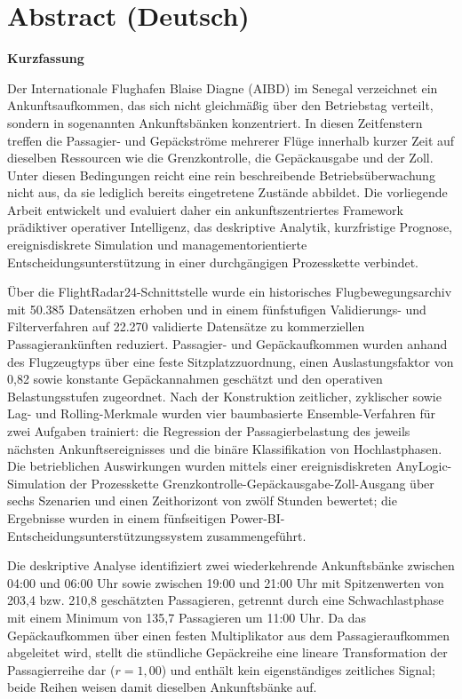 \chapter*{Abstract (Deutsch)}

\begin{center}
    \textbf{Kurzfassung}
\end{center}

Der Internationale Flughafen Blaise Diagne (AIBD) im Senegal verzeichnet ein
Ankunftsaufkommen, das sich nicht gleichmäßig über den Betriebstag verteilt,
sondern in sogenannten Ankunftsbänken konzentriert. In diesen Zeitfenstern
treffen die Passagier- und Gepäckströme mehrerer Flüge innerhalb kurzer Zeit
auf dieselben Ressourcen wie die Grenzkontrolle, die Gepäckausgabe und der Zoll.
Unter diesen Bedingungen reicht eine rein beschreibende Betriebsüberwachung
nicht aus, da sie lediglich bereits eingetretene Zustände abbildet. Die
vorliegende Arbeit entwickelt und evaluiert daher ein ankunftszentriertes
Framework prädiktiver operativer Intelligenz, das deskriptive Analytik,
kurzfristige Prognose, ereignisdiskrete Simulation und managementorientierte
Entscheidungsunterstützung in einer durchgängigen Prozesskette verbindet.

Über die FlightRadar24-Schnittstelle wurde ein historisches
Flugbewegungsarchiv mit 50.385 Datensätzen erhoben und in einem fünfstufigen
Validierungs- und Filterverfahren auf 22.270 validierte Datensätze zu
kommerziellen Passagierankünften reduziert. Passagier- und Gepäckaufkommen
wurden anhand des Flugzeugtyps über eine feste Sitzplatzzuordnung, einen
Auslastungsfaktor von 0,82 sowie konstante Gepäckannahmen geschätzt und den
operativen Belastungsstufen zugeordnet. Nach der Konstruktion zeitlicher,
zyklischer sowie Lag- und Rolling-Merkmale wurden vier baumbasierte
Ensemble-Verfahren für zwei Aufgaben trainiert: die Regression der
Passagierbelastung des jeweils nächsten Ankunftsereignisses und die binäre
Klassifikation von Hochlastphasen. Die betrieblichen Auswirkungen wurden
mittels einer ereignisdiskreten AnyLogic-Simulation der Prozesskette
Grenzkontrolle-Gepäckausgabe-Zoll-Ausgang über sechs Szenarien und einen
Zeithorizont von zwölf Stunden bewertet; die Ergebnisse wurden in einem
fünfseitigen Power-BI-Entscheidungsunterstützungssystem zusammengeführt.

Die deskriptive Analyse identifiziert zwei wiederkehrende Ankunftsbänke
zwischen 04:00 und 06:00 Uhr sowie zwischen 19:00 und 21:00 Uhr mit
Spitzenwerten von 203,4 bzw. 210,8 geschätzten Passagieren, getrennt durch
eine Schwachlastphase mit einem Minimum von 135,7 Passagieren um 11:00 Uhr.
Da das Gepäckaufkommen über einen festen Multiplikator aus dem
Passagieraufkommen abgeleitet wird, stellt die stündliche Gepäckreihe eine
lineare Transformation der Passagierreihe dar ($r = 1{,}00$) und enthält kein
eigenständiges zeitliches Signal; beide Reihen weisen damit dieselben
Ankunftsbänke auf.

